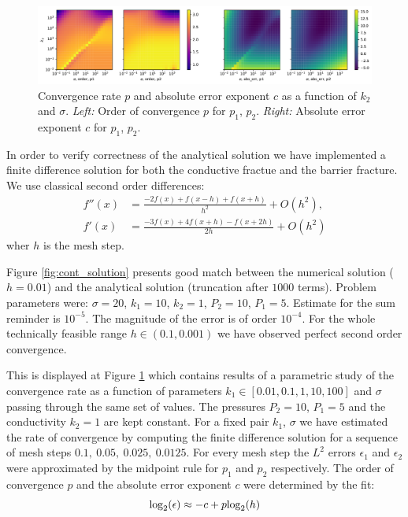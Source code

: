 \documentclass{elsarticle}
\def\log{{\rm log}}
\begin{document}
\begin{figure}
  \label{fig:cont_rate}
  \centering
  \includegraphics[width=\textwidth]{./continuous_conv_rate.pdf}
  \caption{Convergence rate $p$ and absolute error exponent $c$ as a function of $k_2$ and $\sigma$. 
  {\it Left:} Order of convergence $p$ for $p_1$, $p_2$.
  {\it Right:} Absolute error exponent $c$ for $p_1$, $p_2$.}
\end{figure}





In order to verify correctness of the analytical solution we have implemented a finite difference solution for both the conductive fractue 
and the barrier fracture. We use classical second order differences:
\begin{align*}
    f''(x) &= \frac{-2 f(x) + f(x-h) + f(x+h)}{h^2} + O(h^2),\\
    f'(x) &= \frac{-3 f(x) + 4f(x+h) - f(x+2h)}{2h} + O(h^2)
\end{align*}
wher $h$ is the mesh step.

Figure \ref{fig:cont_solution} presents good match between the numerical solution ($h=0.01$) and the analytical solution (truncation after $1000$ terms). 
Problem parameters were: $\sigma=20$, $k_1=10$, $k_2=1$, $P_2=10$, $P_1=5$.
Estimate for the sum reminder is $10^{-5}$. The magnitude of the error is of order $10^{-4}$. For the whole technically feasible range $h\in (0.1, 0.001)$ 
we have observed perfect second order convergence. 

This is displayed at Figure \ref{fig:cont_rate} which contains results of a parametric study of the 
convergence rate as a function of parameters $k_1 \in [0.01, 0.1, 1, 10, 100]$ and $\sigma$ passing through the same set of values. The pressures $P_2=10$, $P_1=5$
and the conductivity $k_2=1$ are kept constant. For a fixed pair $k_1$, $\sigma$ we have estimated the rate of convergence by computing the finite difference solution for a sequence  
of mesh steps $0.1,\ 0.05,\ 0.025,\ 0.0125$. For every mesh step the $L^2$ errors $\epsilon_1$ and $\epsilon_2$ were approximated by the midpoint rule 
for $p_1$ and $p_2$ respectively. The order of convergence $p$ and the absolute error exponent $c$ were determined by the fit:
\[
        \log_2(\epsilon) \approx -c + p\log_2(h) 
\]
\end{document}
